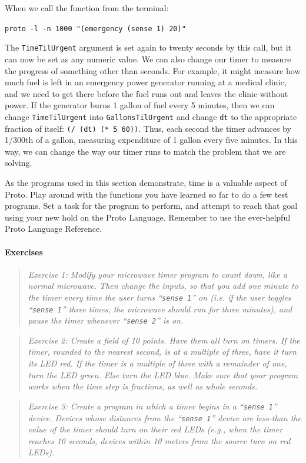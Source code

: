 \documentclass{article}
\newcommand\code[1]{\begin{center}\var{#1}\end{center}}
\newcommand\problem[1]{\begin{quote}{\em #1}\end{quote}}
\newcommand\var[1]{{\tt #1}}
\newcommand\qvar[1]{``{\tt #1}''}
\begin{document}
When we call the function from the terminal:

\code{proto -l -n 1000 "(emergency (sense 1) 20)"}

The \var{TimeTilUrgent} argument is set again to twenty seconds by
this call, but it can now be set as any numeric value.  We can also
change our timer to measure the progress of something other than
seconds.  For example, it might measure how much fuel is left in an
emergency power generator running at a medical clinic, and we need to
get there before the fuel runs out and leaves the clinic without
power.  If the generator burns 1 gallon of fuel every 5 minutes, then
we can change \var{TimeTilUrgent} into \var{GallonsTilUrgent} and
change \var{dt} to the appropriate fraction of itself: \var{(/ (dt) (*
  5 60))}.  Thus, each second the timer advances by 1/300th of a
gallon, measuring expenditure of 1 gallon every five minutes.  In this
way, we can change the way our timer runs to match the problem that we
are solving.

As the programs used in this section demonstrate, time is a valuable
aspect of Proto.  Play around with the functions you have learned so
far to do a few test programs.  Set a task for the program to perform,
and attempt to reach that goal using your new hold on the Proto
Language.  Remember to use the ever-helpful Proto Language Reference.

\paragraph{Exercises}

\problem{Exercise 1: Modify your microwave timer program to count
  down, like a normal microwave.  Then change the inputs, so that you
  add one minute to the timer every time the user turns \qvar{sense 1}
  on (i.e. if the user toggles \qvar{sense 1} three times, the
  microwave should run for three minutes), and pause the timer
  whenever \qvar{sense 2} is on.}

\problem{Exercise 2: Create a field of 10 points. Have them all turn
  on timers.  If the timer, rounded to the nearest second, is at a
  multiple of three, have it turn its LED red.  If the timer is a
  multiple of three with a remainder of one, turn the LED green.  Else
  turn the LED blue.  Make sure that your program works when the time
  step is fractions, as well as whole seconds.}

\problem{Exercise 3: Create a program in which a timer begins in a
  \qvar{sense 1} device.  Devices whose distances from the \qvar{sense 1}
  device are less-than the value of the timer should turn on their red LEDs
  (e.g., when the timer reaches 10 seconds, devices within 10 meters from
  the source turn on red LEDs).}
\end{document}

